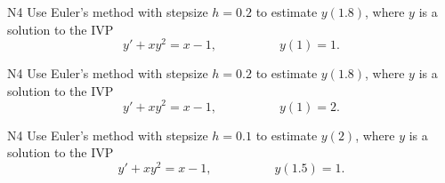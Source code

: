 \begin{problem}{N4}
Use Euler's method with stepsize \(h=0.2\) to estimate \(y(1.8)\), where \(y\) is a solution to the IVP
\[y'+xy^2=x-1,\hspace{5em}y(1)=1.\]
\end{problem}

\begin{problem}{N4}
Use Euler's method with stepsize \(h=0.2\) to estimate \(y(1.8)\), where \(y\) is a solution to the IVP
\[y'+xy^2=x-1,\hspace{5em}y(1)=2.\]
\end{problem}

\begin{problem}{N4}
Use Euler's method with stepsize \(h=0.1\) to estimate \(y(2)\), where \(y\) is a solution to the IVP
\[y'+xy^2=x-1,\hspace{5em}y(1.5)=1.\]
\end{problem}
